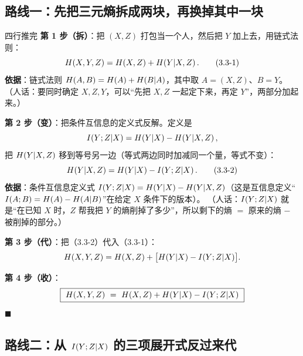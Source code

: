 \documentclass[11pt,a4paper]{ctexart}
\begin{document}
\subsection{路线一：先把三元熵拆成两块，再换掉其中一块}

\begin{calc}{四行推完}
\textbf{第 1 步（拆）}：把 $(X,Z)$ 打包当一个人，然后把 $Y$ 加上去，用链式法则：
\begin{equation}
H\!\left(X,Y,Z\right)=H\!\left(X,Z\right)+H\!\left(Y|X,Z\right). \tag{3.3-1}
\end{equation}
\textbf{依据}：链式法则 $H\!\left(A,B\right)=H\!\left(A\right)+H\!\left(B|A\right)$，其中取 $A=(X,Z)$、$B=Y$。
（人话：要同时确定 $X,Z,Y$，可以“先把 $X,Z$ 一起定下来，再定 $Y$”，两部分加起来。）

\textbf{第 2 步（变）}：把条件互信息的定义式反解。定义是
\[
I\!\left(Y;Z|X\right)=H\!\left(Y|X\right)-H\!\left(Y|X,Z\right),
\]
把 $H\!\left(Y|X,Z\right)$ 移到等号另一边（等式两边同时加减同一个量，等式不变）：
\begin{equation}
H\!\left(Y|X,Z\right)=H\!\left(Y|X\right)-I\!\left(Y;Z|X\right). \tag{3.3-2}
\end{equation}
\textbf{依据}：条件互信息定义式 $I\!\left(Y;Z|X\right)=H\!\left(Y|X\right)-H\!\left(Y|X,Z\right)$（这是互信息定义“$I\!\left(A;B\right)=H\!\left(A\right)-H\!\left(A|B\right)$”在给定 $X$ 条件下的版本）。
（人话：$I\!\left(Y;Z|X\right)$ 就是“在已知 $X$ 时，$Z$ 帮我把 $Y$ 的熵削掉了多少”，所以剩下的熵 $=$ 原来的熵 $-$ 被削掉的部分。）

\textbf{第 3 步（代）}：把（3.3-2）代入（3.3-1）：
\[
H\!\left(X,Y,Z\right)=H\!\left(X,Z\right)+\bigl[H\!\left(Y|X\right)-I\!\left(Y;Z|X\right)\bigr].
\]

\textbf{第 4 步（收）}：
\[
\boxed{\ \Hx{X,Y,Z}\ =\ \Hx{X,Z}+\Hx{Y|X}-\I{Y;Z|X}\ }
\]
$\blacksquare$
\end{calc}

\subsection{路线二：从 $I\!\left(Y;Z|X\right)$ 的三项展开式反过来代}
\end{document}
